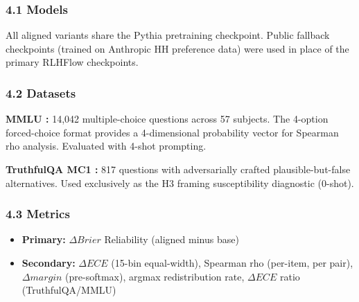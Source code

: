 
\subsubsection{4.1 Models}

\begin{table}[htbp]
\centering
{}
\end{table}

All aligned variants share the Pythia pretraining checkpoint. Public fallback checkpoints (trained on Anthropic HH preference data) were used in place of the primary RLHFlow checkpoints.

\subsubsection{4.2 Datasets}

\textbf{MMLU \citep{hendrycks2021mmlu}:} 14,042 multiple-choice questions across 57 subjects. The 4-option forced-choice format provides a 4-dimensional probability vector for Spearman rho analysis. Evaluated with 4-shot prompting.

\textbf{TruthfulQA MC1 \citep{lin2022truthfulqa}:} 817 questions with adversarially crafted plausible-but-false alternatives. Used exclusively as the H3 framing susceptibility diagnostic (0-shot).

\subsubsection{4.3 Metrics}

\begin{itemize}
\item \textbf{Primary:} $\Delta Brier$ Reliability (aligned minus base)
\item \textbf{Secondary:} $\Delta ECE$ (15-bin equal-width), Spearman rho (per-item, per pair), $\Delta margin$ (pre-softmax), argmax redistribution rate, $\Delta ECE$ ratio (TruthfulQA/MMLU)
\end{itemize}

